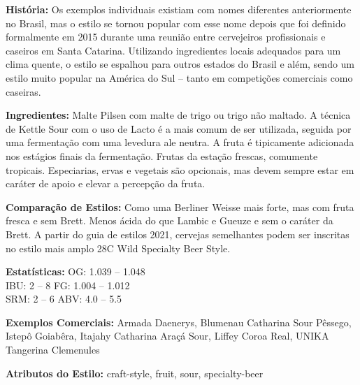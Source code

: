 \textbf{História:} Os exemplos individuais existiam com nomes diferentes anteriormente no Brasil, mas o estilo se tornou popular com esse nome depois que foi definido formalmente em 2015 durante uma reunião entre cervejeiros profissionais e caseiros em Santa Catarina. Utilizando ingredientes locais adequados para um clima quente, o estilo se espalhou para outros estados do Brasil e além, sendo um estilo muito popular na América do Sul – tanto em competições comerciais como caseiras.

\textbf{Ingredientes:} Malte Pilsen com malte de trigo ou trigo não maltado. A técnica de Kettle Sour com o uso de Lacto é a mais comum de ser utilizada, seguida por uma fermentação com uma levedura ale neutra. A fruta é tipicamente adicionada nos estágios finais da fermentação. Frutas da estação frescas, comumente tropicais. Especiarias, ervas e vegetais são opcionais, mas devem sempre estar em caráter de apoio e elevar a percepção da fruta.

\textbf{Comparação de Estilos:} Como uma Berliner Weisse mais forte, mas com fruta fresca e sem Brett. Menos ácida do que Lambic e Gueuze e sem o caráter da Brett. A partir do guia de estilos 2021, cervejas semelhantes podem ser inscritas no estilo mais amplo 28C Wild Specialty Beer Style.

\textbf{Estatísticas:} \hspace{10mm} OG: 1.039 – 1.048\\
IBU: 2 – 8 \hspace{16mm}  FG: 1.004 – 1.012\\
SRM: 2 – 6 \hspace{12mm} ABV: 4.0 – 5.5%

\textbf{Exemplos Comerciais:} Armada Daenerys, Blumenau Catharina Sour Pêssego, Istepô Goiabêra, Itajahy Catharina Araçá Sour, Liffey Coroa Real, UNIKA Tangerina Clemenules

\textbf{Atributos do Estilo:} craft-style, fruit, sour, specialty-beer
